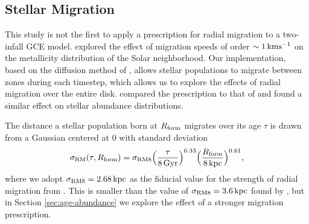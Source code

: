 \documentclass[twocolumn,twocolappendix,linenumbers]{aastex631}
\newcommand{\kpc}{\,{\rm kpc}}
\begin{document}
\subsection{Stellar Migration}
\label{sec:migration}

This study is not the first to apply a prescription for radial migration to a two-infall GCE model. \citet{spitoni_effect_2015} explored the effect of migration speeds of order $\sim1\,{\rm km}{\rm s}^{-1}$ on the metallicity distribution of the Solar neighborhood. 
Our implementation, based on the diffusion method of \citet{frankel_measuring_2018}, allows stellar populations to migrate between zones during each timestep, which allows us to explore the effects of radial migration over the entire disk. \citet{palla_mgfe_2022} compared the \citet{spitoni_effect_2015} prescription to that of \citet{frankel_measuring_2018} and found a similar effect on stellar abundance distributions.

The distance a stellar population born at $R_{\rm form}$ migrates over its age $\tau$ is drawn from a Gaussian centered at 0 with standard deviation
\begin{equation}
    \sigma_{\rm RM}(\tau,R_{\rm form}) = \sigma_{\rm RM8} \Big(\frac{\tau}{8\,{\rm Gyr}}\Big)^{0.33} \Big(\frac{R_{\rm form}}{8\kpc}\Big)^{0.61},
    \label{eq:radial-migration}
\end{equation}
where we adopt $\sigma_{\rm RM8}=2.68\kpc$ as the fiducial value for the strength of radial migration from \citet{dubay_galactic_2024}. This is smaller than the value of $\sigma_{\rm RM8}=3.6\kpc$ found by \citet{frankel_measuring_2018}, but in Section \ref{sec:age-abundance} we explore the effect of a stronger migration prescription.
\end{document}
